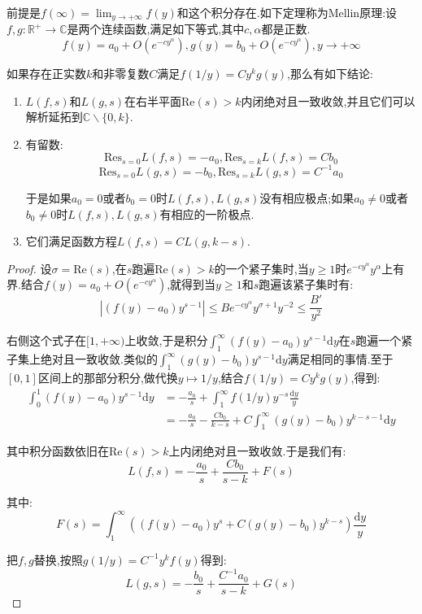 \begin{enumerate}
    前提是$f(\infty)=\lim_{y\to+\infty}f(y)$和这个积分存在.如下定理称为Mellin原理:设$f,g:\mathbb{R}^+\to\mathbb{C}$是两个连续函数,满足如下等式,其中$c,\alpha$都是正数.
    $$f(y)=a_0+O(e^{-cy^{\alpha}}),g(y)=b_0+O(e^{-cy^{\alpha}}),y\to+\infty$$
    
    如果存在正实数$k$和非零复数$C$满足$f(1/y)=Cy^kg(y)$,那么有如下结论:
    \begin{enumerate}[(1)]
    	\item $L(f,s)$和$L(g,s)$在右半平面$\mathrm{Re}(s)>k$内闭绝对且一致收敛,并且它们可以解析延拓到$\mathbb{C}\backslash\{0,k\}$.
    	\item 有留数:
    	$$\mathrm{Res}_{s=0}L(f,s)=-a_0,\mathrm{Res}_{s=k}L(f,s)=Cb_0$$
    	$$\mathrm{Res}_{s=0}L(g,s)=-b_0,\mathrm{Res}_{s=k}L(g,s)=C^{-1}a_0$$
    	
    	于是如果$a_0=0$或者$b_0=0$时$L(f,s),L(g,s)$没有相应极点;如果$a_0\not=0$或者$b_0\not=0$时$L(f,s),L(g,s)$有相应的一阶极点.
    	\item 它们满足函数方程$L(f,s)=CL(g,k-s)$.
    \end{enumerate}
    \begin{proof}
    	
    	设$\sigma=\mathrm{Re}(s)$,在$s$跑遍$\mathrm{Re}(s)>k$的一个紧子集时,当$y\ge1$时$e^{-cy^{\alpha}}y^{\alpha}$上有界.结合$f(y)=a_0+O(e^{-cy^{\alpha}})$,就得到当$y\ge1$和$s$跑遍该紧子集时有:
    	$$\left|(f(y)-a_0)y^{s-1}\right|\le Be^{-cy^{\alpha}}y^{\sigma+1}y^{-2}\le\frac{B'}{y^2}$$
    	
    	右侧这个式子在$[1,+\infty)$上收敛,于是积分$\int_1^{\infty}\left(f(y)-a_0\right)y^{s-1}\mathrm{d}y$在$s$跑遍一个紧子集上绝对且一致收敛.类似的$\int_1^{\infty}\left(g(y)-b_0\right)y^{s-1}\mathrm{d}y$满足相同的事情.至于$[0,1]$区间上的那部分积分,做代换$y\mapsto 1/y$,结合$f(1/y)=Cy^kg(y)$,得到:
    	\begin{align*}
    		\int_0^1\left(f(y)-a_0\right)y^{s-1}\mathrm{d}y&=-\frac{a_0}{s}+\int_1^{\infty}f(1/y)y^{-s}\frac{\mathrm{d}y}{y}\\&=-\frac{a_0}{s}-\frac{Cb_0}{k-s}+C\int_1^{\infty}\left(g(y)-b_0\right)y^{k-s-1}\mathrm{d}y
    	\end{align*}
    	
    	其中积分函数依旧在$\mathrm{Re}(s)>k$上内闭绝对且一致收敛.于是我们有:
    	$$L(f,s)=-\frac{a_0}{s}+\frac{Cb_0}{s-k}+F(s)$$
    	
    	其中:
    	$$F(s)=\int_1^{\infty}\left((f(y)-a_0)y^s+C(g(y)-b_0)y^{k-s}\right)\frac{\mathrm{d}y}{y}$$
    	
    	把$f,g$替换,按照$g(1/y)=C^{-1}y^kf(y)$得到:
    	$$L(g,s)=-\frac{b_0}{s}+\frac{C^{-1}a_0}{s-k}+G(s)$$
    	

\end{proof}
\end{enumerate}
